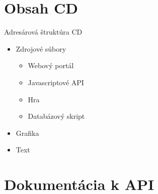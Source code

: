 \chapter{Obsah CD}
Adresárová štruktúra CD
\begin{itemize}
\item Zdrojové súbory
    \begin{itemize}
    \item Webový portál
    \item Javascriptové API
    \item Hra
    \item Databázový skript
    \end{itemize}
\item Grafika
\item Text
\end{itemize}

\chapter{Dokumentácia k API}
